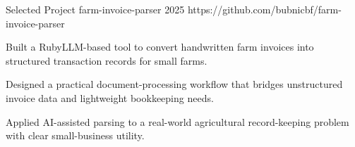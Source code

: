 

\begin{cventries}
\cventry
  {Selected Project}
  {farm-invoice-parser}
  {2025}
  {https://github.com/bubnicbf/farm-invoice-parser}
  {
    \begin{cvitems}
      \item {Built a RubyLLM-based tool to convert handwritten farm invoices into structured transaction records for small farms.}
      \item {Designed a practical document-processing workflow that bridges unstructured invoice data and lightweight bookkeeping needs.}
      \item {Applied AI-assisted parsing to a real-world agricultural record-keeping problem with clear small-business utility.}
    \end{cvitems}
  }


\end{cventries}
